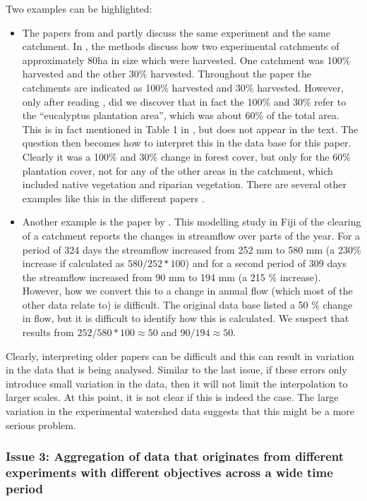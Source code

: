 \documentclass[]{elsarticle} %
\providecommand{\tightlist}{%
  \setlength{\itemsep}{0pt}\setlength{\parskip}{0pt}}
\begin{document}
Two examples can be highlighted:

\begin{itemize}
\tightlist
\item
  The papers from \citet{almeida2016} and \citet{ferreto2020} partly discuss the same experiment and the same catchment. In \citet{almeida2016}, the methods discuss how two experimental catchments of approximately 80ha in size which were harvested. One catchment was 100\% harvested and the other 30\% harvested. Throughout the paper the catchments are indicated as 100\% harvested and 30\% harvested. However, only after reading \citet{ferreto2020}, did we discover that in fact the 100\% and 30\% refer to the ``eucalyptus plantation area'', which was about 60\% of the total area. This is in fact mentioned in Table 1 in \citet{almeida2016}, but does not appear in the text. The question then becomes how to interpret this in the data base for this paper. Clearly it was a 100\% and 30\% change in forest cover, but only for the 60\% plantation cover, not for any of the other areas in the catchment, which included native vegetation and riparian vegetation. There are several other examples like this in the different papers \citep[for example][]{blackie1979kimakia, blackie1979kericho}.
\item
  Another example is the paper by \citet{waterloo2007}. This modelling study in Fiji of the clearing of a catchment reports the changes in streamflow over parts of the year. For a period of 324 days the streamflow increased from 252 mm to 580 mm (a 230\% increase if calculated as \(580/252*100\)) and for a second period of 309 days the streamflow increased from 90 mm to 194 mm (a 215 \% increase). However, how we convert this to a change in annual flow (which most of the other data relate to) is difficult. The original data base listed a 50 \% change in flow, but it is difficult to identify how this is calculated. We suspect that results from \(252/580*100 \approx 50\) and \(90/194 \approx 50\).
\end{itemize}

Clearly, interpreting older papers can be difficult and this can result in variation in the data that is being analysed. Similar to the last issue, if these errors only introduce small variation in the data, then it will not limit the interpolation to larger scales. At this point, it is not clear if this is indeed the case. The large variation in the experimental watershed data suggests that this might be a more serious problem.

\hypertarget{issue-3-aggregation-of-data-that-originates-from-different-experiments-with-different-objectives-across-a-wide-time-period}{%
\subsubsection{Issue 3: Aggregation of data that originates from different experiments with different objectives across a wide time period}\label{issue-3-aggregation-of-data-that-originates-from-different-experiments-with-different-objectives-across-a-wide-time-period}}
\end{document}
